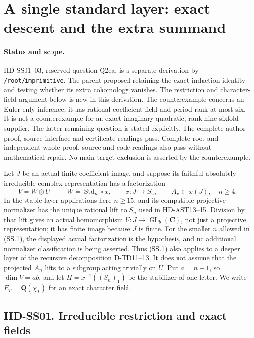 \section{A single standard layer: exact descent and the extra summand}
\label{sec:standard-single-factor}

\paragraph{Status and scope.}
HD-SS01--03, reserved question Q2ea, is a separate derivation by
\texttt{/root/imprimitive}.  The parent proposed retaining the exact
induction identity and testing whether its extra cohomology vanishes.
The restriction and character-field argument below is new in this
derivation.  The counterexample concerns an Euler-only inference;
it has rational coefficient field and period rank at most six.
It is not a counterexample for an exact imaginary-quadratic, rank-nine
sixfold supplier.  The latter remaining question is stated explicitly.
The complete author proof, source-interface and certificate readings
pass. Complete root and independent whole-proof, source and code
readings also pass without mathematical repair. No main-target exclusion
is asserted by the counterexample.

Let $J$ be an actual finite coefficient image, and suppose its faithful
absolutely irreducible complex representation has a factorization
\[
 V=W\otimes U,\qquad W=\operatorname{Std}_n\circ x,
 \qquad x:J\longrightarrow S_n,
 \qquad A_n\subset x(J),\quad n\ge4.
 \tag{SS.1}
\]
In the stable-layer applications here $n\ge15$, and its compatible
projective normalizer has the unique rational lift to $S_n$ used
in HD-AST13--15.  Division by that lift gives an actual homomorphism
$U:J\to\operatorname{GL}_b(\mathbf C)$, not just a projective
representation; it has finite image because $J$ is finite.
For the smaller $n$ allowed in (SS.1), the displayed actual
factorization is the hypothesis, and no additional normalizer
classification is being asserted.  Thus (SS.1) also applies to
a deeper layer of the recursive
decomposition D-TD11--13.  It does not assume that the projected
$A_n$ lifts to a subgroup acting trivially on $U$.
Put $a=n-1$, so $\dim V=ab$, and let
$H=x^{-1}((S_n)_1)$ be the stabilizer of one letter.
We write $F_T=\mathbf Q(\chi_T)$ for an exact character field.

\subsection*{HD-SS01. Irreducible restriction and exact fields}

